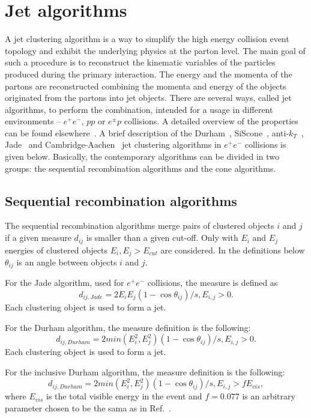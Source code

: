 \section{Jet algorithms}
\label{sec:algorithms}
A jet clustering algorithm is a way to simplify the high energy collision event topology 
 and exhibit the underlying physics at the parton level. The main goal of such a procedure is to
 reconstruct the kinematic variables of the particles produced during the primary interaction.
 The energy and the momenta of the partons are reconstructed combining the 
 momenta and energy of the objects originated from the partons into jet objects.
 There are several ways, called jet algorithms,
  to perform the combination, intended for a usage in different environments -- $e^+e^-$, $pp$ or $e^{\pm}p$ collisions. 
  A detailed overview of the properties can be found elsewhere~\cite{Ali:2010tw}.
 A brief description 
 of the Durham~\cite{Catani:1991hj}, SiScone~\cite{Cacciari:2005hq}, anti-$k_{T}$~\cite{Cacciari:2008gp}, Jade~\cite{Bartel:1986ua}
  and Cambridge-Aachen~\cite{Dokshitzer:1997in} jet clustering algorithms in $e^+e^-$ collisions is given below.
Basically, the contemporary algorithms can be divided in two groups: the sequential recombination algorithms and the cone algorithms.


\subsection{Sequential recombination algorithms}
\label{sec:algorithmssequential}
The sequential recombination algorithms merge pairs of clustered objects $i$ and $j$
if a given measure $d_{ij}$ is smaller than a given cut-off. Only with $E_i$ and $E_j$ energies of clustered objects
$E_i,E_j>E_{cut}$ are considered. 
In the definitions below $\theta_{ij}$ is an angle between objects $i$ and $j$.

For the Jade algorithm, used for $e^+e^-$ collisions, the measure is defined as 
$$
d_{ij,Jade}=2E_iE_j(1-\cos{\theta_{ij}})/s, E_{i,j}>0.
$$
 Each clustering object is used to form a jet.

For the Durham algorithm, the measure definition is the following:
$$
d_{ij,Durham}=2min(E_i^2,E_j^2)(1-\cos{\theta_{ij}})/s, E_{i,j}>0.
$$ 
Each clustering object is used to form a jet.


For the inclusive Durham algorithm, the measure definition is the following:
$$
d_{ij,Durham}=2min(E_i^2,E_j^2)(1-\cos{\theta_{ij}})/s, E_{i,j}>fE_{vis},
$$
where $E_{vis}$ is the total visible energy in the event
and $f=0.077$ is an arbitrary parameter chosen to be the sama as in Ref.~\cite{Catani:1991hj}.


